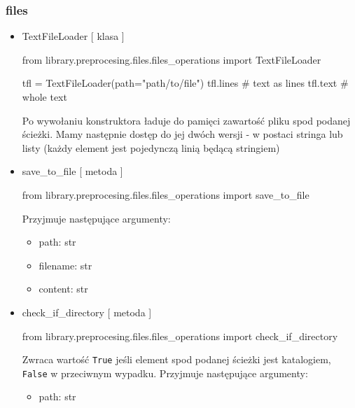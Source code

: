 \subsubsection{files}

\myspace
{}
\myspace

\begin{itemize}

\item{TextFileLoader [ klasa ] }

\begin{python}
from library.preprocesing.files.files_operations import TextFileLoader

tfl = TextFileLoader(path="path/to/file")
tfl.lines  # text as lines
tfl.text   # whole text
\end{python}

Po wywołaniu konstruktora ładuje do pamięci zawartość pliku spod podanej ścieżki. Mamy następnie 
dostęp do jej dwóch wersji - w postaci stringa lub listy (każdy element jest pojedynczą 
linią będącą stringiem)

\item{save\_to\_file [ metoda ] }
\begin{import}
from library.preprocesing.files.files_operations import save_to_file
\end{import}

Przyjmuje następujące argumenty:
\begin{itemize}
	\item path: str
	\item filename: str
	\item content: str
\end{itemize}

\item{check\_if\_directory [ metoda ] }
\begin{import}
from library.preprocesing.files.files_operations import check_if_directory
\end{import}
Zwraca wartość \texttt{True} jeśli element spod podanej ścieżki jest katalogiem, \texttt{False} w przeciwnym wypadku.
Przyjmuje następujące argumenty:
\begin{itemize}
	\item path: str
\end{itemize}


\end{itemize}
